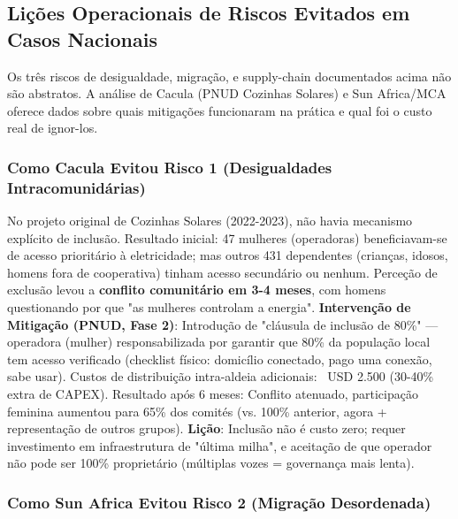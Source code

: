 \documentclass[12pt, a4paper]{article}
\begin{document}
\subsection{Lições Operacionais de Riscos Evitados em Casos Nacionais}

Os três riscos de desigualdade, migração, e supply-chain documentados acima não são abstratos. A análise de Cacula (PNUD Cozinhas Solares) e Sun Africa/MCA oferece dados sobre quais mitigações funcionaram na prática e qual foi o custo real de ignor-los.

\subsubsection*{Como Cacula Evitou Risco 1 (Desigualdades Intracomunidárias)}

No projeto original de Cozinhas Solares (2022-2023), não havia mecanismo explícito de inclusão. Resultado inicial: 47 mulheres (operadoras) beneficiavam-se de acesso prioritário à eletricidade; mas outros 431 dependentes (crianças, idosos, homens fora de cooperativa) tinham acesso secundário ou nenhum. Perceção de exclusão levou a
\textbf{conflito comunitário em 3-4 meses}, com homens questionando por que "as mulheres controlam a energia".
\textbf{Intervenção de Mitigação (PNUD, Fase 2)}: Introdução de "cláusula de inclusão de 80\%" — operadora (mulher) responsabilizada por garantir que 80\% da população local tem acesso verificado (checklist físico: domicílio conectado, pago uma conexão, sabe usar). Custos de distribuição intra-aldeia adicionais: ~USD 2.500 (30-40\% extra de CAPEX). Resultado após 6 meses: Conflito atenuado, participação feminina aumentou para 65\% dos comités (vs. 100\% anterior, agora + representação de outros grupos).
\textbf{Lição}: Inclusão não é custo zero; requer investimento em infraestrutura de "última milha", e aceitação de que operador não pode ser 100\% proprietário (múltiplas vozes = governança mais lenta).

\subsubsection*{Como Sun Africa Evitou Risco 2 (Migração Desordenada)}
\end{document}

